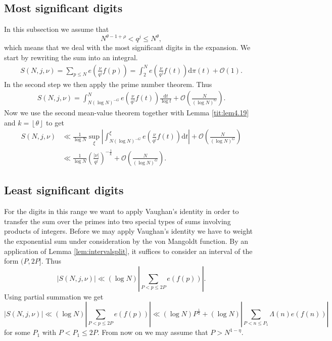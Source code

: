 \documentclass[a4paper,10pt]{amsart}
\numberwithin{equation}{section}
\theoremstyle{definition}
\theoremstyle{remark}
\newcommand{\lf}{\left\lfloor}
\newcommand{\rf}{\right\rfloor}
\renewcommand{\lvert}{\left\vert}
\renewcommand{\rvert}{\right\vert}
\begin{document}
\subsection{Most significant digits}
In this subsection we assume that
\[
N^{\theta-1+\rho}<q^j\leq N^\theta,
\]
which means that we deal with the most significant digits in the expansion. We
start by rewriting the sum into an integral.
\begin{align*}
S(N,j,\nu)=\sum_{p\leq N}e\left(\frac{\nu}{q^j}f(p)\right)
=\int_{2}^{N}e\left(\frac{\nu}{q^j}f(t)\right)\mathrm{d}\pi(t)+\mathcal{O}(1).
\end{align*}
In the second step we then apply the prime number theorem. Thus
\begin{align*}
S(N,j,\nu)
=\int_{N(\log N)^{-G}}^{N}
e\left(\frac{\nu}{q^j}f(t)\right)
\frac{\mathrm{d}t}{\log t}
+\mathcal{O}\left(\frac{N}{(\log N)^G}\right).
\end{align*}
Now we use the second mean-value theorem together with Lemma \ref{tit:lem4.19}
and $k=\lf\theta\rf$ to get
\begin{equation}\label{mani:res:most}
\begin{split}
S(N,j,\nu)&\ll\frac1{\log N}\sup_{\xi}
  \lvert\int_{N(\log N)^{-G}}^{\xi}e\left(\frac{\nu}{q^j}f(t)\right)\mathrm{d}t\rvert
  +\mathcal{O}\left(\frac{N}{(\log N)^G}\right)\\
&\ll\frac1{\log N}\left(\frac{\lvert \nu\rvert}{q^j}\right)^{-\frac1k}
  +\mathcal{O}\left(\frac{N}{(\log N)^G}\right).
\end{split}
\end{equation}

\subsection{Least significant digits}
For the digits in this range we want to apply Vaughan's identity in order to
transfer the sum over the primes into two special types of sums involving
products of integers. Before we may apply Vaughan's identity we have to weight
the exponential sum under consideration by the von Mangoldt function. By an
application of Lemma \ref{lem:intervalsplit}, it suffices to consider an
interval of the form $(P,2P]$. Thus
\[
\lvert S(N,j,\nu)\rvert
\ll(\log N)\lvert\sum_{P<p\leq2P}e\left(f(p)\right)\rvert.
\]
Using partial summation we get
\[
\lvert S(N,j,\nu)\rvert
\ll(\log N)
\lvert\sum_{P<p\leq 2P}e\left(f(p)\right)\rvert
\ll (\log N)P^{\frac12}+(\log N)\lvert\sum_{P<n\leq P_1}\Lambda(n)e\left(f(n)\right)\rvert
\]
for some $P_1$ with $P<P_1\leq 2P$. From now on we may assume that
$P>N^{1-\eta}$. 
\end{document}
